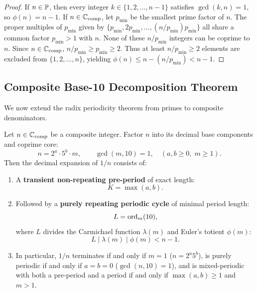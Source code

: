 \begin{proof}
\leanok
If $n \in \mathbb{P}$, then every integer $k \in \{1, 2, \dots, n-1\}$ satisfies $\gcd(k, n) = 1$, so $\phi(n) = n - 1$.
If $n \in \mathbb{C}_{\mathrm{comp}}$, let $p_{\min}$ be the smallest prime factor of $n$. The proper multiples of $p_{\min}$ given by $\{p_{\min}, 2 p_{\min}, \dots, (n/p_{\min}) p_{\min}\}$ all share a common factor $p_{\min} > 1$ with $n$. None of these $n/p_{\min}$ integers can be coprime to $n$. Since $n \in \mathbb{C}_{\mathrm{comp}}$, $n/p_{\min} \ge p_{\min} \ge 2$. Thus at least $n/p_{\min} \ge 2$ elements are excluded from $\{1, 2, \dots, n\}$, yielding $\phi(n) \le n - (n/p_{\min}) < n - 1$.
\end{proof}

\subsection{Composite Base-10 Decomposition Theorem}

We now extend the radix periodicity theorem from primes to composite denominators.

\begin{theorem}
\label{thm:composite_radix}
\leanok
Let $n \in \mathbb{C}_{\mathrm{comp}}$ be a composite integer. Factor $n$ into its decimal base components and coprime core:
\begin{equation}
\label{eq:n_base_factorization}
n = 2^a \cdot 5^b \cdot m, \qquad \gcd(m, 10) = 1, \quad (a, b \ge 0, \; m \ge 1).
\end{equation}
Then the decimal expansion of $1/n$ consists of:
\begin{enumerate}[label=(\alph*)]
  \item A \textbf{transient non-repeating pre-period} of exact length:
  \begin{equation}
  \label{eq:preperiod_length}
  K = \max(a, b).
  \end{equation}
  \item Followed by a \textbf{purely repeating periodic cycle} of minimal period length:
  \begin{equation}
  \label{eq:composite_period_length}
  L = \operatorname{ord}_m(10),
  \end{equation}
  where $L$ divides the Carmichael function $\lambda(m)$ and Euler's totient $\phi(m)$:
  \begin{equation}
  L \mid \lambda(m) \mid \phi(m) < n - 1.
  \end{equation}
  \item In particular, $1/n$ terminates if and only if $m = 1$ ($n = 2^a 5^b$), is purely periodic if and only if $a = b = 0$ ($\gcd(n, 10) = 1$), and is mixed-periodic with both a pre-period and a period if and only if $\max(a, b) \ge 1$ and $m > 1$.
\end{enumerate}
\end{theorem}

